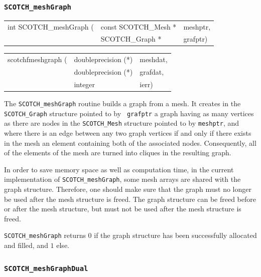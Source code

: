 \subsubsection{{\tt SCOTCH\_meshGraph}}

\begin{itemize}
\progsyn

{\tt\begin{tabular}{l@{}ll}
int SCOTCH\_meshGraph ( & const SCOTCH\_Mesh * & meshptr, \\
                        & SCOTCH\_Graph *      & grafptr)
\end{tabular}}

{\tt\begin{tabular}{l@{}ll}
scotchfmeshgraph ( & doubleprecision (*) & meshdat, \\
                   & doubleprecision (*) & grafdat, \\
                   & integer             & ierr)
\end{tabular}}

\progdes

The {\tt SCOTCH\_meshGraph} routine builds a graph from a mesh. It
creates in the {\tt SCOTCH\_\lbt Graph} structure pointed to by {\tt
grafptr} a graph having as many vertices as there are nodes in the
{\tt SCOTCH\_\lbt Mesh} structure pointed to by {\tt meshptr}, and
where there is an edge between any two graph vertices if and only if
there exists in the mesh an element containing both of the associated
nodes. Consequently, all of the elements of the mesh are turned into
cliques in the resulting graph.

In order to save memory space as well as computation time, in the
current implementation of {\tt SCOTCH\_meshGraph}, some mesh
arrays are shared with the graph structure. Therefore, one should make
sure that the graph must no longer be used after the mesh structure
is freed. The graph structure can be freed before or after the mesh
structure, but must not be used after the mesh structure is freed.

\progret

{\tt SCOTCH\_meshGraph} returns $0$ if the graph structure has been
successfully allocated and filled, and $1$ else.
\end{itemize}

\subsubsection{{\tt SCOTCH\_meshGraphDual}}
\label{sec-lib-func-meshgraphdual}

